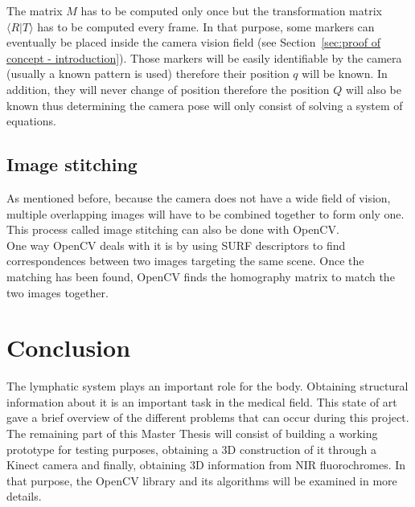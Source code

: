 The matrix $M$ has to be computed only once but the transformation matrix $\langle R\vert T\rangle$ has to be computed every frame. In that purpose, some markers can eventually be placed inside the camera vision field (see Section~\ref{sec:proof of concept - introduction}). Those markers will be easily identifiable by the camera (usually a known pattern is used) therefore their position $q$ will be known. In addition, they will never change of position therefore the position $Q$ will also be known thus determining the camera pose will only consist of solving a system of equations.

\subsection{Image stitching}

As mentioned before, because the camera does not have a wide field of vision, multiple overlapping images will have to be combined together to form only one. This process called image stitching can also be done with OpenCV.\\

One way OpenCV deals with it is by using SURF descriptors \cite{bay_surf:_2006} to find correspondences between two images targeting the same scene. Once the matching has been found, OpenCV finds the homography matrix to match the two images together. 

\section{Conclusion}

The lymphatic system plays an important role for the body. Obtaining structural information about it is an important task in the medical field. This state of art gave a brief overview of the different problems that can occur during this project. The remaining part of this Master Thesis will consist of building a working prototype for testing purposes, obtaining a 3D construction of it through a Kinect camera and finally, obtaining 3D information from NIR fluorochromes. In that purpose, the OpenCV library and its algorithms will be examined in more details.
